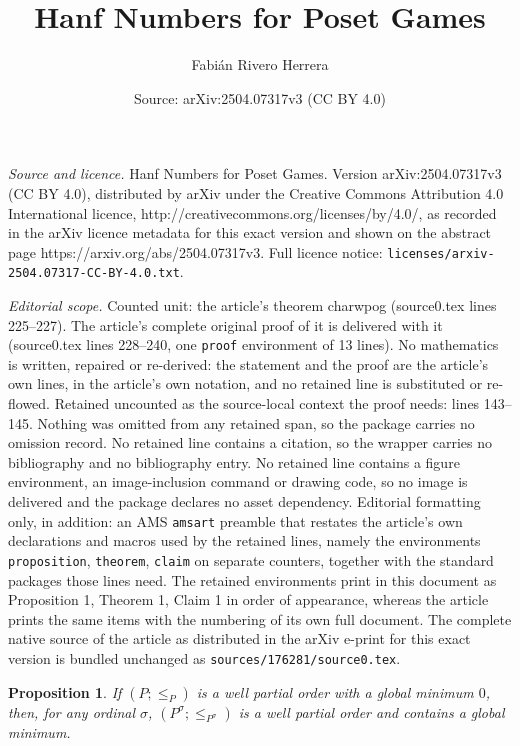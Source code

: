 \documentclass[10pt,a4paper]{amsart}
\title{Hanf Numbers for Poset Games}
\author{Fabi\'an Rivero Herrera}
\date{Source: arXiv:2504.07317v3 (CC BY 4.0)}
\newtheorem{proposition}{Proposition}
\begin{document}
\maketitle

\noindent\emph{Source and licence.} Hanf Numbers for Poset Games. Version arXiv:2504.07317v3 (CC BY 4.0), distributed by arXiv under the Creative Commons Attribution 4.0 International licence, http://creativecommons.org/licenses/by/4.0/, as recorded in the arXiv licence metadata for this exact version and shown on the abstract page https://arxiv.org/abs/2504.07317v3. Full licence notice: \texttt{licenses/arxiv-2504.07317-CC-BY-4.0.txt}.\par\smallskip

\noindent\textit{Editorial scope.} Counted unit: the article's theorem charwpog (source0.tex lines 225--227). The article's complete original proof of it is delivered with it (source0.tex lines 228--240, one \texttt{proof} environment of 13 lines). No mathematics is written, repaired or re-derived: the statement and the proof are the article's own lines, in the article's own notation, and no retained line is substituted or re-flowed.  Retained uncounted as the source-local context the proof needs: lines 143--145.  Nothing was omitted from any retained span, so the package carries no omission record.  No retained line contains a citation, so the wrapper carries no bibliography and no bibliography entry.  No retained line contains a figure environment, an image-inclusion command or drawing code, so no image is delivered and the package declares no asset dependency.  Editorial formatting only, in addition: an AMS \texttt{amsart} preamble that restates the article's own declarations and macros used by the retained lines, namely the environments \texttt{proposition}, \texttt{theorem}, \texttt{claim} on separate counters, together with the standard packages those lines need.  The retained environments print in this document as Proposition 1, Theorem 1, Claim 1 in order of appearance, whereas the article prints the same items with the numbering of its own full document.  The complete native source of the article as distributed in the arXiv e-print for this exact version is bundled unchanged as \texttt{sources/176281/source0.tex}.
\begin{proposition}\label{profini}
    If \((P; \leq_P)\) is a well partial order with a global minimum $0$, then, for any ordinal \(\sigma\), \((P^\sigma; \leq_{P^\sigma})\) is a well partial order and contains a global minimum.
\end{proposition}
\end{document}
